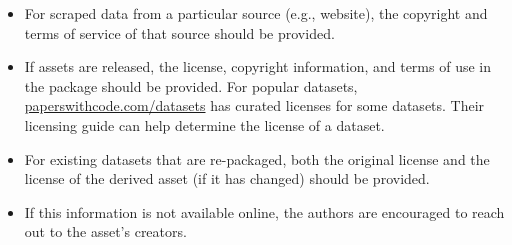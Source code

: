 \begin{enumerate}
\begin{itemize}
        \item For scraped data from a particular source (e.g., website), the copyright and terms of service of that source should be provided.
        \item If assets are released, the license, copyright information, and terms of use in the package should be provided. For popular datasets, \url{paperswithcode.com/datasets} has curated licenses for some datasets. Their licensing guide can help determine the license of a dataset.
        \item For existing datasets that are re-packaged, both the original license and the license of the derived asset (if it has changed) should be provided.
        \item If this information is not available online, the authors are encouraged to reach out to the asset's creators.
    \end{itemize}


\end{enumerate}
